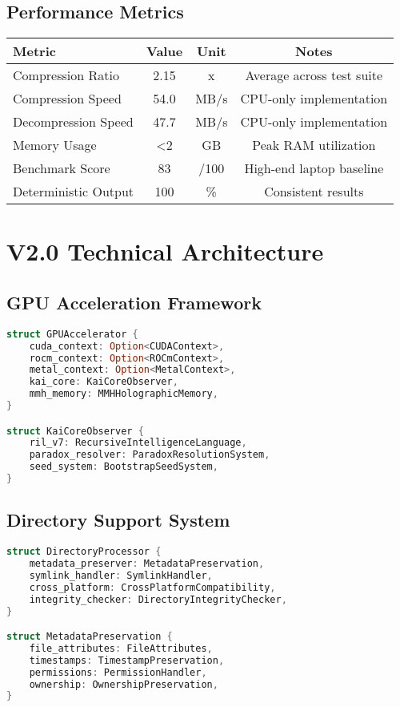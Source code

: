 \documentclass[12pt,a4paper]{article}
\begin{document}
\subsection{Performance Metrics}
\begin{center}
\begin{tabular}{|l|c|c|c|}
\hline
\textbf{Metric} & \textbf{Value} & \textbf{Unit} & \textbf{Notes} \\
\hline
Compression Ratio & 2.15 & x & Average across test suite \\
Compression Speed & 54.0 & MB/s & CPU-only implementation \\
Decompression Speed & 47.7 & MB/s & CPU-only implementation \\
Memory Usage & <2 & GB & Peak RAM utilization \\
Benchmark Score & 83 & /100 & High-end laptop baseline \\
Deterministic Output & 100 & \% & Consistent results \\
\hline
\end{tabular}
\end{center}

\section{V2.0 Technical Architecture}

\subsection{GPU Acceleration Framework}
\begin{lstlisting}[language=Rust, caption=V2.0 GPU Architecture]
struct GPUAccelerator {
    cuda_context: Option<CUDAContext>,
    rocm_context: Option<ROCmContext>,
    metal_context: Option<MetalContext>,
    kai_core: KaiCoreObserver,
    mmh_memory: MMHHolographicMemory,
}

struct KaiCoreObserver {
    ril_v7: RecursiveIntelligenceLanguage,
    paradox_resolver: ParadoxResolutionSystem,
    seed_system: BootstrapSeedSystem,
}
\end{lstlisting}

\subsection{Directory Support System}
\begin{lstlisting}[language=Rust, caption=V2.0 Directory Processing]
struct DirectoryProcessor {
    metadata_preserver: MetadataPreservation,
    symlink_handler: SymlinkHandler,
    cross_platform: CrossPlatformCompatibility,
    integrity_checker: DirectoryIntegrityChecker,
}

struct MetadataPreservation {
    file_attributes: FileAttributes,
    timestamps: TimestampPreservation,
    permissions: PermissionHandler,
    ownership: OwnershipPreservation,
}
\end{lstlisting}
\end{document}

